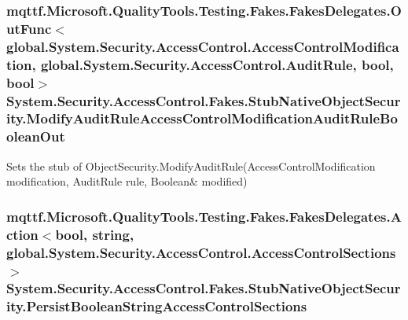 \hypertarget{class_system_1_1_security_1_1_access_control_1_1_fakes_1_1_stub_native_object_security_a1dd75474973531c0c9f6cb486f6ce7a7}{
\subsubsection[{Modify\-Audit\-Rule\-Access\-Control\-Modification\-Audit\-Rule\-Boolean\-Out}]{\setlength{\rightskip}{0pt plus 5cm}mqttf.\-Microsoft.\-Quality\-Tools.\-Testing.\-Fakes.\-Fakes\-Delegates.\-Out\-Func$<$global.\-System.\-Security.\-Access\-Control.\-Access\-Control\-Modification, global.\-System.\-Security.\-Access\-Control.\-Audit\-Rule, bool, bool$>$ System.\-Security.\-Access\-Control.\-Fakes.\-Stub\-Native\-Object\-Security.\-Modify\-Audit\-Rule\-Access\-Control\-Modification\-Audit\-Rule\-Boolean\-Out}}\label{class_system_1_1_security_1_1_access_control_1_1_fakes_1_1_stub_native_object_security_a1dd75474973531c0c9f6cb486f6ce7a7}


Sets the stub of Object\-Security.\-Modify\-Audit\-Rule(Access\-Control\-Modification modification, Audit\-Rule rule, Boolean\& modified)

\hypertarget{class_system_1_1_security_1_1_access_control_1_1_fakes_1_1_stub_native_object_security_ab8c9e8ae905391f60318682c0f268e04}{
\subsubsection[{Persist\-Boolean\-String\-Access\-Control\-Sections}]{\setlength{\rightskip}{0pt plus 5cm}mqttf.\-Microsoft.\-Quality\-Tools.\-Testing.\-Fakes.\-Fakes\-Delegates.\-Action$<$bool, string, global.\-System.\-Security.\-Access\-Control.\-Access\-Control\-Sections$>$ System.\-Security.\-Access\-Control.\-Fakes.\-Stub\-Native\-Object\-Security.\-Persist\-Boolean\-String\-Access\-Control\-Sections}}\label{class_system_1_1_security_1_1_access_control_1_1_fakes_1_1_stub_native_object_security_ab8c9e8ae905391f60318682c0f268e04}


